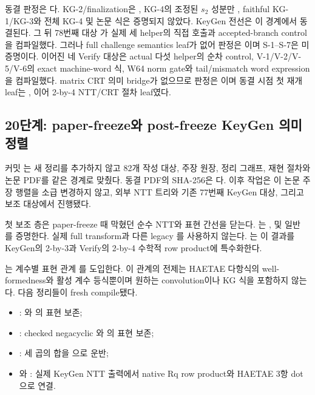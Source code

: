 동결 판정은 다. KG-2/finalization은
\statusproved, KG-4의 조정된 \(s_2\) 성분만 \statusproved, faithful KG-1/KG-3와
전체 KG-4 및 논문 식은 증명되지 않았다. KeyGen 전선은 이 경계에서 동결된다.
그 뒤 78번째 대상 가 실제 세 helper의 직접
호출과 accepted-branch control을 컴파일했다. 그러나 full challenge semantics
leaf가 없어 판정은 이며 S-1--S-7은
미증명이다. 이어진 네 Verify 대상은 actual 다섯 helper의 순차 control,
V-1/V-2/V-5/V-6의 exact machine-word 식, W64 norm gate와 tail/mismatch word
expression을 컴파일했다. matrix CRT 의미 bridge가 없으므로 판정은
이며 동결 시점 첫 재개 leaf는
, 이어 2-by-4 NTT/CRT 절차 leaf였다.

\subsection{20단계: paper-freeze와 post-freeze KeyGen 의미 정렬}
\label{subsec:post-freeze-keygen}

커밋 는 새 정리를
추가하지 않고 82개 작성 대상, 주장 원장, 정리 그래프, 재현 절차와 논문 PDF를
같은  경계로 맞췄다. 동결 PDF의 SHA-256은
다.
이후 작업은 이 논문 주장 행렬을 소급 변경하지 않고, 외부 NTT 트리와 기존
77번째 KeyGen 대상, 그리고  보조 대상에서 진행됐다.

첫 보조 층은 paper-freeze 때 막혔던 순수 NTT와 표현 간선을 닫는다.
\allowbreak
{}는
,
 및 일반
를 증명한다. 실제 full transform과
다른 legacy 를 사용하지 않는다.
\allowbreak{}는 이 결과를 KeyGen의 2-by-3과
Verify의 2-by-4 수학적 row product에 특수화한다.

는 계수별 표현 관계
를 도입한다. 이 관계의 전제는 HAETAE 다항식의
well-formedness와 활성 계수 등식뿐이며 원하는 convolution이나 KG 식을 포함하지
않는다. 다음 정리들이 fresh compile됐다.

\begin{itemize}
  \item {}: 와
        의 표현 보존;
  \item {}: checked negacyclic
        와 의 표현 보존;
  \item {}: 세 곱의 합을
        으로 운반;
  \item {}와
        : 실제 KeyGen NTT 출력에서
        native Rq row product와 HAETAE 3항 dot으로 연결.
\end{itemize}

